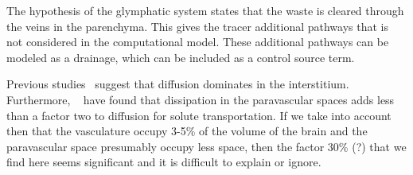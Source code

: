 \documentclass[11pt,a4paper]{article}
\begin{document}
The hypothesis of the glymphatic system \cite{iliff2012paravascular} states that the waste is cleared through the veins in the parenchyma. This gives the tracer additional pathways that is not considered in the computational model. These additional pathways can be modeled as a drainage, which can be included as a control source term. 

Previous studies~\cite{holter2017interstitial, smith2017glymphatic} suggest that diffusion dominates in the interstitium. Furthermore, 
~\cite{asgari2016glymphatic, brynjfm, Diem} have found that dissipation in the paravascular spaces adds less than a factor two
to diffusion for solute transportation. If we take into account then that the vasculature occupy 3-5\% of the volume
of the brain and the paravascular space presumably occupy less space, then the factor 30\% (?) that we find here 
seems significant and it is difficult to explain or ignore.      



 



%
%
% 
% 
% 
%
% 
\end{document}
